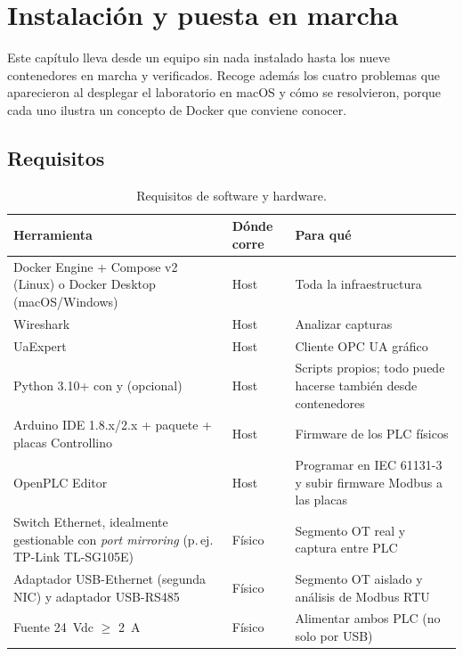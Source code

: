 \chapter{Instalación y puesta en marcha}
\label{cap:instalacion}

Este capítulo lleva desde un equipo sin nada instalado hasta los nueve contenedores en marcha y verificados. Recoge además los cuatro problemas que aparecieron al desplegar el laboratorio en macOS y cómo se resolvieron, porque cada uno ilustra un concepto de Docker que conviene conocer.

\section{Requisitos}

\begin{table}[H]
\centering\small
\caption{Requisitos de software y hardware.}
\label{tab:requisitos}
\begin{tabularx}{\textwidth}{L{5.2cm} L{2.6cm} X}
\toprule
\textbf{Herramienta} & \textbf{Dónde corre} & \textbf{Para qué} \\
\midrule
Docker Engine + Compose v2 (Linux) o Docker Desktop (macOS/Windows) & Host & Toda la infraestructura \\
Wireshark & Host & Analizar capturas \\
UaExpert & Host & Cliente OPC UA gráfico \\
Python 3.10+ con  y  (opcional) & Host & Scripts propios; todo puede hacerse también desde contenedores \\
Arduino IDE 1.8.x/2.x + paquete  + placas Controllino & Host & Firmware de los PLC físicos \\
OpenPLC Editor & Host & Programar en IEC 61131-3 y subir firmware Modbus a las placas \\
Switch Ethernet, idealmente gestionable con \emph{port mirroring} (p.\,ej. TP-Link TL-SG105E) & Físico & Segmento OT real y captura entre PLC \\
Adaptador USB-Ethernet (segunda NIC) y adaptador USB-RS485 & Físico & Segmento OT aislado y análisis de Modbus RTU \\
Fuente 24~Vdc $\geq$ 2~A & Físico & Alimentar ambos PLC (no solo por USB) \\
\bottomrule
\end{tabularx}
\end{table}

